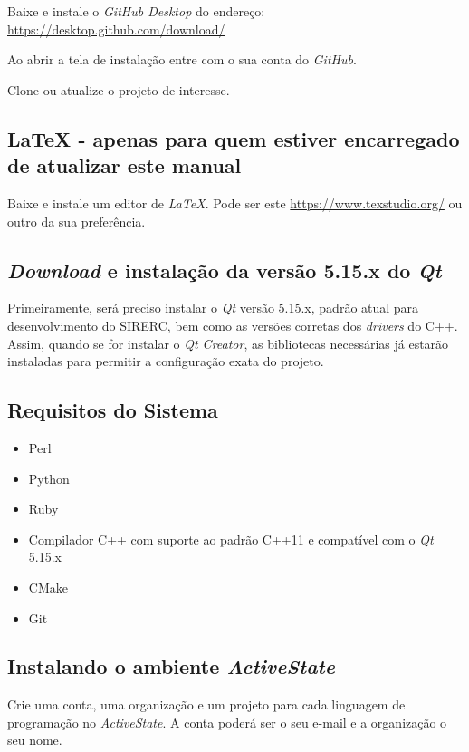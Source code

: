 \documentclass[a4paper,11pt]{article}
\newcommand{\sistema}{\textsf{SIRERC}}
\newcommand{\qtcreator}{\textit{Qt Creator}}
\newcommand{\qt}{\textit{Qt}}
\newcommand{\github}{\textit{GitHub}}
\begin{document}
Baixe e instale o \textit{GitHub Desktop} do endereço: \url{https://desktop.github.com/download/}

Ao abrir a tela de instalação entre com o sua conta do \github{}.

Clone ou atualize o projeto de interesse.


\subsection*{LaTeX - apenas para quem estiver encarregado de atualizar este manual}

Baixe e instale um editor de \textit{LaTeX}. Pode ser este \url{https://www.texstudio.org/} ou outro da sua preferência.

\subsection{\textit{Download} e instalação da versão 5.15.x do \qt{}}
\label{qt5}

Primeiramente, será preciso instalar o \qt{} versão 5.15.x, padrão atual para desenvolvimento do \sistema{}, bem como as versões corretas dos \textit{drivers} do C++. Assim, quando se for instalar o \qtcreator{}, as bibliotecas necessárias já estarão instaladas para permitir a configuração exata do projeto.


\subsection*{Requisitos do Sistema}

\begin{itemize}
	\item Perl
	\item Python
	\item Ruby
	\item Compilador C++ com suporte ao padrão C++11 e compatível com o \qt{} 5.15.x
	\item CMake
	\item Git
\end{itemize}

\subsection*{Instalando o ambiente \textit{ActiveState}}

Crie uma conta, uma organização e um projeto para cada linguagem de programação no \textit{ActiveState}. A conta poderá ser o seu e-mail e a organização o seu nome.
\end{document}
